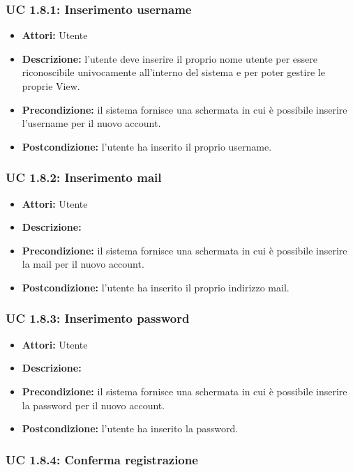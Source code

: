 \subsubsection{UC 1.8.1: Inserimento username}

\begin{itemize}
\item \textbf{Attori:} Utente
\item \textbf{Descrizione:} l'utente deve inserire il proprio nome utente per essere riconoscibile univocamente all'interno del sistema e per poter gestire le proprie View.
\item \textbf{Precondizione:} il sistema fornisce una schermata in cui è possibile inserire l'username per il nuovo account.
\item \textbf{Postcondizione:} l'utente ha inserito il proprio username.
\end{itemize}

\subsubsection{UC 1.8.2: Inserimento mail}

\begin{itemize}
\item \textbf{Attori:} Utente
\item \textbf{Descrizione:} 
\item \textbf{Precondizione:} il sistema fornisce una schermata in cui è possibile inserire la mail per il nuovo account.
\item \textbf{Postcondizione:} l'utente ha inserito il proprio indirizzo mail.
\end{itemize}

\subsubsection{UC 1.8.3: Inserimento password}

\begin{itemize}
\item \textbf{Attori:} Utente
\item \textbf{Descrizione:} 
\item \textbf{Precondizione:} il sistema fornisce una schermata in cui è possibile inserire la password per il nuovo account.
\item \textbf{Postcondizione:} l'utente ha inserito la password.
\end{itemize}

\subsubsection{UC 1.8.4: Conferma registrazione}

